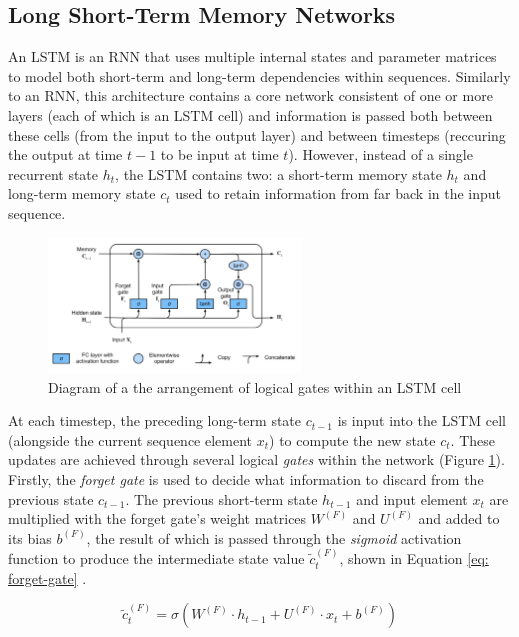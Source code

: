 \documentclass[a4paper, 11pt]{report}
\begin{document}
    \subsection{Long Short-Term Memory Networks}

    An LSTM is an RNN that uses multiple internal states and parameter matrices to model both short-term and long-term dependencies within sequences. Similarly to an RNN, this architecture contains a core network consistent of one or more layers (each of which is an LSTM cell) and information is passed both between these cells (from the input to the output layer) and between timesteps (reccuring the output at time $t-1$ to be input at time $t$). However, instead of a single recurrent state $h_t$, the LSTM contains two: a short-term memory state $h_t$ and long-term memory state $c_t$ used to retain information from far back in the input sequence.

    \begin{figure}[ht]
        \centering
        \includegraphics[width=0.6\textwidth]{lstm.png}
        \caption{\centering Diagram of a the arrangement of logical gates within an LSTM cell \citep{zhang-2021}}
        \label{fig: lstm}
    \end{figure}

    At each timestep, the preceding long-term state $c_{t-1}$ is input into the LSTM cell (alongside the current sequence element $x_t$) to compute the new state $c_t$. These updates are achieved through several logical \emph{gates} within the network (Figure \ref{fig: lstm}). Firstly, the \emph{forget gate} is used to decide what information to discard from the previous state $c_{t-1}$. The previous short-term state $h_{t-1}$ and input element $x_t$ are multiplied with the forget gate's weight matrices $W^{(F)}$ and $U^{(F)}$ and added to its bias $b^{(F)}$, the result of which is passed through the \emph{sigmoid} activation function to produce the intermediate state value $\tilde{c}^{(F)}_t$, shown in Equation \ref{eq: forget-gate} \citep{zhang-2021}.

    \begin{equation}
        \label{eq: forget-gate}
        \tilde{c}^{(F)}_t = \sigma( W^{(F)} \cdot h_{t-1} + U^{(F)} \cdot x_t + b^{(F)} )
    \end{equation}
\end{document}

